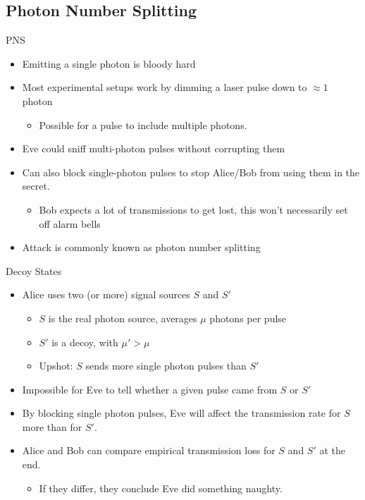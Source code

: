 \documentclass[pdf]{beamer}
\begin{document}
\subsection{Photon Number Splitting}
\begin{frame}{PNS}
  \begin{itemize}
  \item Emitting a single photon is bloody hard
  \pause\item Most experimental setups work by dimming a laser pulse down to
    $\approx 1$ photon
    \begin{itemize}
    \item Possible for a pulse to include multiple photons.
    \end{itemize}
  \pause\item Eve could sniff multi-photon pulses without corrupting them
  \pause\item Can also block single-photon pulses to stop Alice/Bob from using them
    in the secret.
    \begin{itemize}
    \item Bob expects a lot of transmissions to get lost, this won't necessarily
      set off alarm bells
    \end{itemize}
  \pause\item Attack is commonly known as photon number splitting
  \end{itemize}
\end{frame}
\begin{frame}{Decoy States}
  \begin{itemize}
  \item Alice uses two (or more) signal sources $S$ and $S'$
    \begin{itemize}
    \item $S$ is the real photon source, averages $\mu$ photons per pulse
    \item $S'$ is a decoy, with $\mu' > \mu$
    \item Upshot: $S$ sends more single photon pulses than $S'$
    \end{itemize}
  \pause\item Impossible for Eve to tell whether a given pulse came from $S$ or $S'$
  \pause\item By blocking single photon pulses, Eve will affect the transmission rate
    for $S$ more than for $S'$.
  \pause\item Alice and Bob can compare empirical transmission loss for $S$ and $S'$
    at the end.
    \begin{itemize}
    \item If they differ, they conclude Eve did something naughty.
    \end{itemize}
  \end{itemize}
\end{frame}
\end{document}
